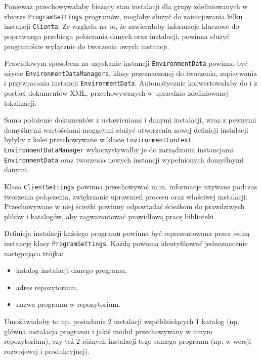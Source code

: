 \documentclass[polish,12pt,titlepage]{article}
\begin{document}
Ponieważ przechowywałaby bieżący stan instalacji dla grupy zdefiniowanych
w zbiorze \texttt{ProgramSettings} programów, mogłaby służyć do zainicjowania
kilku instancji \texttt{Clienta}. Ze względu na to, że zawierałaby informacje
kluczowe do poprawnego przebiegu pobierania danych oraz instalacji, powinna
służyć programiście wyłącznie do tworzenia owych instancji.

Prawidłowym sposobem na uzyskanie instancji \texttt{EnvironmentData} powinno 
być użycie \texttt{EnvironmentDataManagera}, klasy przeznaczonej do tworzenia,
zapisywania i przywracania instancji \texttt{EnvironmentData}. Automatycznie
konwertowałaby do i z postaci dokumentów XML, przechowywanych w uprzednio
zdefiniowanej lokalizacji.

Samo położenie dokumentów z ustawieniami i danymi instalacji, wraz z pewnymi
domyślnymi wartościami mogącymi służyć utworzeniu nowej definicji instalacji
byłyby z kolei przechowywane w klasie \texttt{EnvironmentContext}.
\texttt{EnvironmentDataManager} wykorzystywałby je do zarządzania instancjami
\texttt{EnvironmentData} oraz tworzenia nowych instancji wypełnionych
domyślnymi danymi.

Klasa \texttt{ClientSettings} powinna przechowywać m.in. informacje używane
podczas tworzenia połączenia, zwiększanie uprawnień procesu oraz właściwej
instalacji. Przechowywane w niej ścieżki powinny odpowiadać ścieżkom do
prawdziwych plików i katalogów, aby zagwarantować prawidłową pracę biblioteki.

Definicja instalacji każdego programu powinna być reprezentowana przez jedną
instancję klasy \texttt{ProgramSettings}. Każdą powinna identyfikować
jednoznacznie następująca trójka:
\begin{itemize}
  \item katalog instalacji danego programu,
  \item adres repozytorium,
  \item nazwa programu w repozytorium.
\end{itemize}
Umożliwiałoby to np. posiadanie 2 instalacji współdzielących 1 katalog (np.
główna instalacja programu i jakiś moduł przechowywany w innym repozytorium),
czy też 2 różnych instalacji tego samego programu (np. w wersji rozwojowej
i produkcyjnej).
\end{document}

